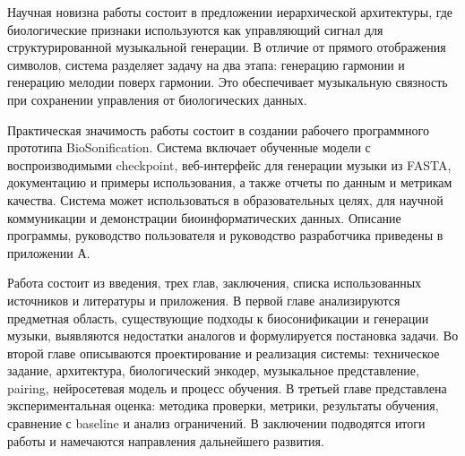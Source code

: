 Научная новизна работы состоит в предложении иерархической архитектуры, где биологические признаки используются как управляющий сигнал для структурированной музыкальной генерации. В отличие от прямого отображения символов, система разделяет задачу на два этапа: генерацию гармонии и генерацию мелодии поверх гармонии. Это обеспечивает музыкальную связность при сохранении управления от биологических данных.

Практическая значимость работы состоит в создании рабочего программного прототипа BioSonification. Система включает обученные модели с воспроизводимыми checkpoint, веб-интерфейс для генерации музыки из FASTA, документацию и примеры использования, а также отчеты по данным и метрикам качества. Система может использоваться в образовательных целях, для научной коммуникации и демонстрации биоинформатических данных. Описание программы, руководство пользователя и руководство разработчика приведены в приложении А.

Работа состоит из введения, трех глав, заключения, списка использованных источников и литературы и приложения. В первой главе анализируются предметная область, существующие подходы к биосонификации и генерации музыки, выявляются недостатки аналогов и формулируется постановка задачи. Во второй главе описываются проектирование и реализация системы: техническое задание, архитектура, биологический энкодер, музыкальное представление, pairing, нейросетевая модель и процесс обучения. В третьей главе представлена экспериментальная оценка: методика проверки, метрики, результаты обучения, сравнение с baseline и анализ ограничений. В заключении подводятся итоги работы и намечаются направления дальнейшего развития.
